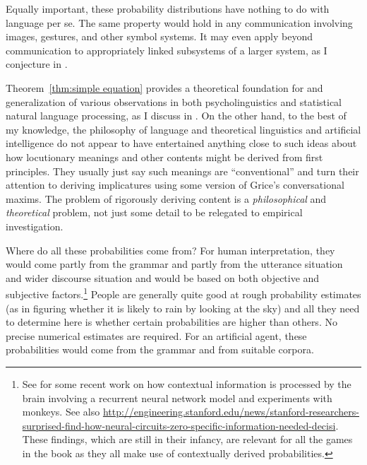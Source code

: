 Equally important, these probability distributions have nothing to do with language per se. The same property would hold in any communication involving images, gestures, and other symbol systems. It may even apply beyond communication to appropriately linked subsystems of a larger system, as I conjecture in \citet[Section~7.1.4]{parikh:le}.

Theorem~\ref{thm:simple equation} provides a theoretical foundation for and generalization of various observations in both psycholinguistics and statistical natural language processing, as I discuss in . On the other hand, to the best of my knowledge, the philosophy of language and theoretical linguistics and artificial intelligence do not appear to have entertained anything close to such ideas about how locutionary meanings and other contents might be derived from first principles. They usually just say such meanings are ``conventional'' and turn their attention to deriving implicatures using some version of Grice's conversational maxims. The problem of rigorously deriving content is a \emph{philosophical} and \emph{theoretical} problem, not just some detail to be relegated to empirical investigation.

Where do all these probabilities come from? For human interpretation, they would come partly from the grammar and partly from the utterance situation and wider discourse situation and would be based on both objective and subjective factors.\footnote{See \citet{mssn:cdcrdpc} for some recent work on how contextual information is processed by the brain involving a recurrent neural network model and experiments with monkeys. See also \url{http://engineering.stanford.edu/news/stanford-researchers-surprised-find-how-neural-circuits-zero-specific-information-needed-decisi}. These findings, which are still in their infancy, are relevant for all the games in the book as they all make use of contextually derived probabilities.} People are generally quite good at rough probability estimates (as in figuring whether it is likely to rain by looking at the sky) and all they need to determine here is whether certain probabilities are higher than others. No precise numerical estimates are required. For an artificial agent, these probabilities would come from the grammar and from suitable corpora.

